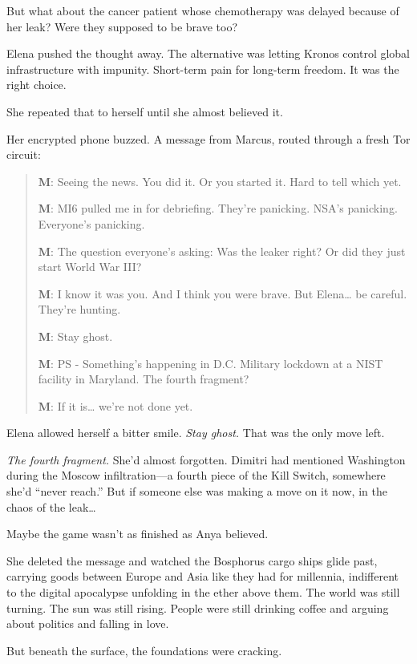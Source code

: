 But what about the cancer patient whose chemotherapy was delayed because of her leak? Were they supposed to be brave too?

Elena pushed the thought away. The alternative was letting Kronos control global infrastructure with impunity. Short-term pain for long-term freedom. It was the right choice.

She repeated that to herself until she almost believed it.

Her encrypted phone buzzed. A message from Marcus, routed through a fresh Tor circuit:

\begin{quote}
\textbf{M}: Seeing the news. You did it. Or you started it. Hard to tell which yet.

\textbf{M}: MI6 pulled me in for debriefing. They're panicking. NSA's panicking. Everyone's panicking.

\textbf{M}: The question everyone's asking: Was the leaker right? Or did they just start World War III?

\textbf{M}: I know it was you. And I think you were brave. But Elena\ldots{} be careful. They're hunting.

\textbf{M}: Stay ghost.

\textbf{M}: PS - Something's happening in D.C. Military lockdown at a NIST facility in Maryland. The fourth fragment?

\textbf{M}: If it is\ldots{} we're not done yet.
\end{quote}

Elena allowed herself a bitter smile. \emph{Stay ghost.} That was the only move left.

\emph{The fourth fragment.} She'd almost forgotten. Dimitri had mentioned Washington during the Moscow infiltration---a fourth piece of the Kill Switch, somewhere she'd ``never reach.'' But if someone else was making a move on it now, in the chaos of the leak\ldots{}

Maybe the game wasn't as finished as Anya believed.

She deleted the message and watched the Bosphorus cargo ships glide past, carrying goods between Europe and Asia like they had for millennia, indifferent to the digital apocalypse unfolding in the ether above them. The world was still turning. The sun was still rising. People were still drinking coffee and arguing about politics and falling in love.

But beneath the surface, the foundations were cracking.

